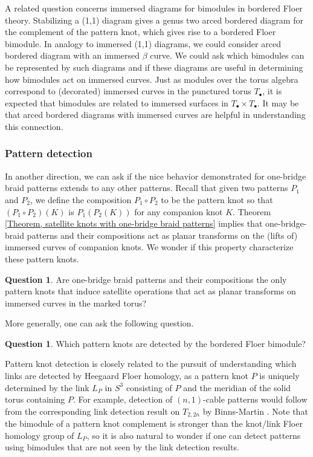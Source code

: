 \documentclass{amsart}
\theoremstyle{definition}
\newtheorem{que}[thm]{Question}
\theoremstyle{remark}
\numberwithin{equation}{section}
\numberwithin{equation}{section} \makeatletter
\begin{document}
A related question concerns immersed diagrams for bimodules in bordered Floer theory. Stabilizing a (1,1) diagram gives a genus two arced bordered diagram for the complement of the pattern knot, which gives rise to a bordered Floer bimodule. In analogy to immersed (1,1) diagrams, we could consider arced bordered diagram with an immersed $\beta$ curve. We could ask which bimodules can be represented by such diagrams and if these diagrams are useful in determining how bimodules act on immersed curves. Just as modules over the torus algebra correspond to (decorated) immersed curves in the punctured torus $T_\bullet$, it is expected that bimodules are related to immersed surfaces in $T_\bullet\times T_\bullet$. It may be that arced bordered diagrams with immersed curves are helpful in understanding this connection.


\subsubsection{Pattern detection}
In another direction, we can ask if the nice behavior demonstrated for one-bridge braid patterns extends to any other patterns. Recall that given two patterns $P_1$ and $P_2$, we define the composition $P_1\circ P_2$ to be the pattern knot so that $(P_1\circ P_2) (K)$ is $P_1(P_2(K))$ for any companion knot $K$. Theorem \ref{Theorem, satellite knots with one-bridge braid patterns} implies that one-bridge-braid patterns and their compositions act as planar transforms on the (lifts of) immersed curves of companion knots. We wonder if this property characterize these pattern knots.
\begin{que}
	Are one-bridge braid patterns and their compositions the only pattern knots that induce satellite operations that act as planar transforms on immersed curves in the marked torus?
\end{que}
More generally, one can ask the following question.
\begin{que}
	 Which pattern knots are detected by the bordered Floer bimodule?
\end{que}
 Pattern knot detection is closely related to the pursuit of understanding which links are detected by Heegaard Floer homology, as a pattern knot $P$ is uniquely determined by the link $L_P$ in $S^3$ consisting of $P$ and the meridian of the solid torus containing $P$. For example, detection of $(n,1)$-cable patterns would follow from the corresponding link detection result on $T_{2,2n}$ by Binns-Martin \cite[Theorem 3.2]{Binns2020}. Note that the bimodule of a pattern knot complement is stronger than the knot/link Floer homology group of $L_P$, so it is also natural to wonder if one can detect patterns using bimodules that are not seen by the link detection results. 
\end{document}

